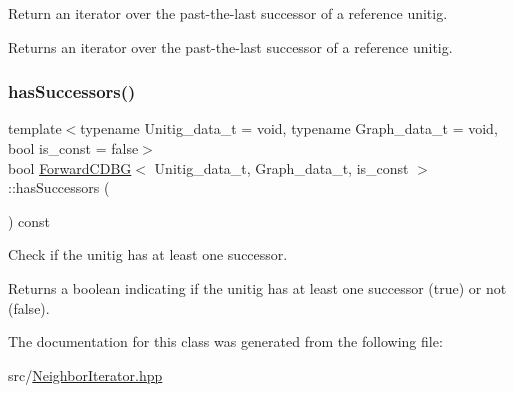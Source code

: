 Return an iterator over the past-\/the-\/last successor of a reference unitig. 

\begin{DoxyReturn}{Returns}
an iterator over the past-\/the-\/last successor of a reference unitig. 
\end{DoxyReturn}
\mbox{\label{classForwardCDBG_a17b11e73f1754c52ff4bb771bdefca08}} 
\subsubsection{\texorpdfstring{has\+Successors()}{hasSuccessors()}}
{\footnotesize\ttfamily template$<$typename Unitig\+\_\+data\+\_\+t  = void, typename Graph\+\_\+data\+\_\+t  = void, bool is\+\_\+const = false$>$ \\
bool \hyperlink{classForwardCDBG}{Forward\+C\+D\+BG}$<$ Unitig\+\_\+data\+\_\+t, Graph\+\_\+data\+\_\+t, is\+\_\+const $>$\+::has\+Successors (\begin{DoxyParamCaption}{ }\end{DoxyParamCaption}) const}



Check if the unitig has at least one successor. 

\begin{DoxyReturn}{Returns}
a boolean indicating if the unitig has at least one successor (true) or not (false). 
\end{DoxyReturn}


The documentation for this class was generated from the following file\+:\begin{DoxyCompactItemize}
\item 
src/\hyperlink{NeighborIterator_8hpp}{Neighbor\+Iterator.\+hpp}\end{DoxyCompactItemize}
